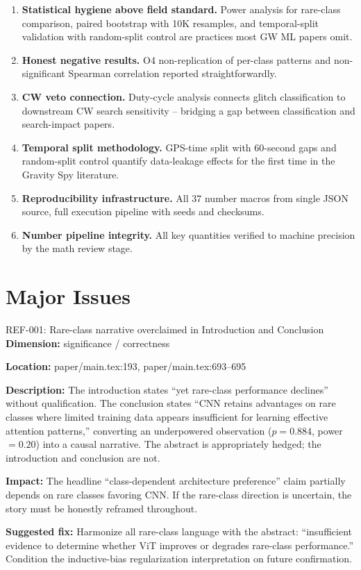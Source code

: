 \documentclass[11pt]{article}
\begin{document}
\begin{StrengthBox}
\begin{enumerate}
  \item \textbf{Statistical hygiene above field standard.} Power analysis for rare-class comparison, paired bootstrap with 10K resamples, and temporal-split validation with random-split control are practices most GW ML papers omit.
  \item \textbf{Honest negative results.} O4 non-replication of per-class patterns and non-significant Spearman correlation reported straightforwardly.
  \item \textbf{CW veto connection.} Duty-cycle analysis connects glitch classification to downstream CW search sensitivity -- bridging a gap between classification and search-impact papers.
  \item \textbf{Temporal split methodology.} GPS-time split with 60-second gaps and random-split control quantify data-leakage effects for the first time in the Gravity Spy literature.
  \item \textbf{Reproducibility infrastructure.} All 37 number macros from single JSON source, full execution pipeline with seeds and checksums.
  \item \textbf{Number pipeline integrity.} All key quantities verified to machine precision by the math review stage.
\end{enumerate}
\end{StrengthBox}


\section*{Major Issues}

\begin{MajorIssueBox}{REF-001: Rare-class narrative overclaimed in Introduction and Conclusion}
\textbf{Dimension:} significance / correctness

\textbf{Location:} paper/main.tex:193, paper/main.tex:693--695

\textbf{Description:} The introduction states ``yet rare-class performance declines'' without qualification. The conclusion states ``CNN retains advantages on rare classes where limited training data appears insufficient for learning effective attention patterns,'' converting an underpowered observation ($p = 0.884$, power $= 0.20$) into a causal narrative. The abstract is appropriately hedged; the introduction and conclusion are not.

\textbf{Impact:} The headline ``class-dependent architecture preference'' claim partially depends on rare classes favoring CNN. If the rare-class direction is uncertain, the story must be honestly reframed throughout.

\textbf{Suggested fix:} Harmonize all rare-class language with the abstract: ``insufficient evidence to determine whether ViT improves or degrades rare-class performance.'' Condition the inductive-bias regularization interpretation on future confirmation.
\end{MajorIssueBox}
\end{document}
